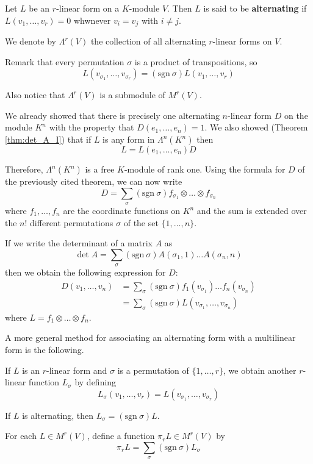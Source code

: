 \begin{definition}
	Let $L$ be an $r$-linear form on a $K$-module $V$. Then $L$ is said to be \textbf{alternating} if $L(v_1, \ldots, v_r) = 0$ whwnever $v_i = v_j$ with $i \neq j$.
	
	We denote by $\Lambda^r(V)$ the collection of all alternating $r$-linear forms on $V$.
\end{definition}

Remark that every permutation $\sigma$ is a product of transpositions, so
\[
	L(v_{\sigma_1}, \ldots, v_{\sigma_r}) = (\text{sgn}~\sigma) L(v_1, \ldots, v_r)
\]

Also notice that $\Lambda^r(V)$ is a submodule of $M^r(V)$.

\begin{remark}
	We already showed that there is precisely one alternating $n$-linear form $D$ on the module $K^n$ with the property that $D(e_1, \ldots, e_n) = 1$. We also showed (Theorem \ref{thm:det_A_I}) that if $L$ is any form in $\Lambda^n(K^n)$ then
	\[
		L = L(e_1, \ldots, e_n)D
	\]
	
	Therefore, $\Lambda^n(K^n)$ is a free $K$-module of rank one. Using the formula for $D$ of the previously cited theorem, we can now write
	\[
		D = \sum_\sigma (\text{sgn}~\sigma) f_{\sigma_1} \otimes \ldots \otimes f_{\sigma_n}
	\]
	where $f_1, \ldots, f_n$ are the coordinate functions on $K^n$ and the sum is extended over the $n!$ different permutations $\sigma$ of the set $\{ 1, \ldots, n \}$.
	
	If we write the determinant of a matrix $A$ as
	\[
		\det A = \sum_\sigma (\text{sgn}~\sigma) A(\sigma_1, 1) \ldots A(\sigma_n, n)
	\]
	then we obtain the following expression for $D$:
	\begin{equation*}
		\begin{aligned}
			D(v_1, \ldots, v_n) &= \sum_\sigma (\text{sgn}~\sigma) f_1(v_{\sigma_1}) \ldots f_n(v_{\sigma_n}) \\
			&= \sum_\sigma (\text{sgn}~\sigma) L(v_{\sigma_1}, \ldots, v_{\sigma_n})
		\end{aligned}
	\end{equation*}
	where $L = f_1 \otimes \ldots \otimes f_n$.
\end{remark}

A more general method for associating an alternating form with a multilinear form is the following.

\begin{remark}
	If $L$ is an $r$-linear form and $\sigma$ is a permutation of $\{ 1, \ldots, r \}$, we obtain another $r$-linear function $L_\sigma$ by defining
	\[
		L_\sigma(v_1, \ldots, v_r) = L(v_{\sigma_1}, \ldots, v_{\sigma_r})
	\]
	
	If $L$ is alternating, then $L_\sigma = (\text{sgn}~\sigma) L$.
	
	For each $L \in M^r(V)$, define a function $\pi_r L \in M^r(V)$ by
	\[
		\pi_r L = \sum_\sigma (\text{sgn}~\sigma) L_\sigma
	\]
\end{remark}

